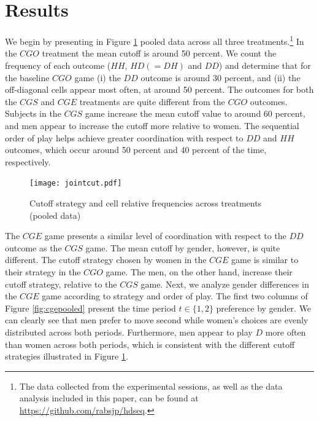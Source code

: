 \documentclass[11pt, letterpaper]{article}
\theoremstyle{plain}
\begin{document}
\section{Results}
\label{sec:results}

We begin by presenting in Figure \ref{fig:cutpooled} pooled data across all three treatments.\footnote{The data collected from the experimental sessions, as well as the data analysis included in this paper, can be found at \url{https://github.com/rabsjp/hdseq}.} In the $CGO$ treatment the mean cutoff is around 50 percent. We count the frequency of each outcome ($HH$, $HD (=DH)$ and $DD$) and determine that for the baseline $CGO$ game (i) the $DD$ outcome is around 30 percent, and (ii) the off-diagonal cells appear most often, at around 50 percent. The outcomes for both the $CGS$ and $CGE$ treatments are quite different from the $CGO$ outcomes. Subjects in the $CGS$ game increase the mean cutoff value to around 60 percent, and men appear to increase the cutoff more relative to women. The sequential order of play helps achieve greater coordination with respect to $DD$ and $HH$ outcomes, which occur around 50 percent and 40 percent of the time, respectively. 

\begin{center}
\begin{figure}[ht]
\centering{}%
\texttt{[image: jointcut.pdf]}%
\caption{Cutoff strategy and cell relative frequencies across treatments (pooled data)} 
\label{fig:cutpooled}
\end{figure}
\par\end{center}

The $CGE$ game presents a similar level of coordination with respect to the $DD$ outcome as the $CGS$ game. The mean cutoff by gender, however, is quite different. The cutoff strategy chosen by women in the $CGE$ game is similar to their strategy in the $CGO$ game. The men, on the other hand, increase their cutoff strategy, relative to the $CGS$ game. Next, we analyze gender differences in the $CGE$ game according to strategy and order of play. The first two columns of Figure \ref{fig:cgepooled} present the time period $t\in\{1,2\}$ preference by gender. We can clearly see that men prefer to move second while women's choices are evenly distributed across both periods. Furthermore, men appear to play $D$ more often than women across both periods, which is consistent with the different cutoff strategies illustrated in Figure \ref{fig:cutpooled}.
\end{document}
